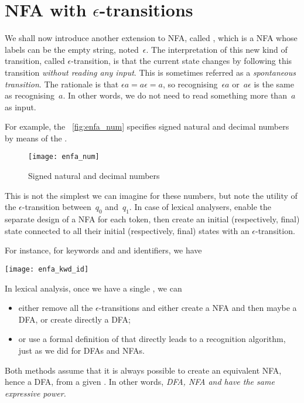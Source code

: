 \section{NFA with $\epsilon$-transitions}

We shall now introduce another extension to NFA, called \eNFA, which
is a NFA whose labels can be the empty string, noted~\(\epsilon\).
The interpretation of this new kind of transition, called
\(\epsilon\)-transition, is that the current state changes by
following this transition \emph{without reading any input}. This is
sometimes referred as a \emph{spontaneous transition}. The rationale
is that \(\epsilon a = a \epsilon = a\), so recognising~\(\epsilon a\)
or~\(a\epsilon\) is the same as recognising~\(a\). In other words, we
do not need to read something more than~\(a\) as input.

For example, the \fig~\vref{fig:enfa_num} specifies signed natural and
decimal numbers by means of the \eNFA.
\begin{figure}
\centering
\texttt{[image: enfa\_num]}
\caption{Signed natural and decimal numbers}
\label{fig:enfa_num}
\end{figure}
This is not the simplest \eNFA we can imagine for these numbers, but
note the utility of the \(\epsilon\)-transition between~\(q_0\)
and~\(q_1\). In case of lexical analysers,  enable the
separate design of a NFA for each token, then create an initial
(respectively, final) state connected to all their initial
(respectively, final) states with an \(\epsilon\)-transition.

For instance, for keywords  and  and
identifiers, we have
\begin{center}
\texttt{[image: enfa\_kwd\_id]}
\end{center}
In lexical analysis, once we have a single \eNFA, we can
\begin{itemize}

  \item either remove all the \(\epsilon\)-transitions and either create
  a NFA and then maybe a DFA, or create directly a DFA;

  \item or use a formal definition of \eNFA that directly leads to a
  recognition algorithm, just as we did for DFAs and NFAs.

\end{itemize}
Both methods assume that it is always possible to create an equivalent
NFA, hence a DFA, from a given \eNFA.  In other words, \emph{DFA, NFA
  and \eNFA have the same expressive power.}


